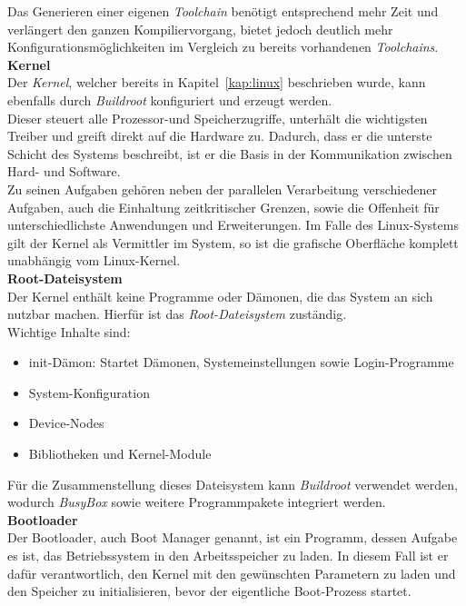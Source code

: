 Das Generieren einer eigenen \emph{Toolchain} benötigt entsprechend mehr Zeit und verlängert den ganzen Kompiliervorgang, bietet jedoch deutlich mehr Konfigurationsmöglichkeiten
im Vergleich zu bereits vorhandenen \emph{Toolchains}.\\

\textbf{Kernel}\\

Der \emph{Kernel}, welcher bereits in Kapitel~\ref{kap:linux} beschrieben wurde, kann ebenfalls durch \emph{Buildroot} konfiguriert und erzeugt werden.\\
Dieser steuert alle Prozessor-und Speicherzugriffe, unterhält die wichtigsten Treiber und greift direkt auf die Hardware zu. Dadurch, dass er die unterste Schicht des Systems beschreibt,
ist er die Basis in der Kommunikation zwischen Hard- und Software.\\
Zu seinen Aufgaben gehören neben der parallelen Verarbeitung verschiedener Aufgaben, auch die Einhaltung zeitkritischer Grenzen, sowie die Offenheit für unterschiedlichste Anwendungen
und Erweiterungen. Im Falle des Linux-Systems gilt der Kernel als Vermittler im System, so ist die grafische Oberfläche komplett unabhängig vom Linux-Kernel.\cite{datacenter}\\

\textbf{Root-Dateisystem}\\

Der Kernel enthält keine Programme oder Dämonen, die das System an sich nutzbar machen. Hierfür ist das \emph{Root-Dateisystem} zuständig.\\
Wichtige Inhalte sind:
\begin{itemize}
  \item init-Dämon: Startet Dämonen, Systemeinstellungen sowie Login-Programme
  \item System-Konfiguration
  \item Device-Nodes
  \item Bibliotheken und Kernel-Module
\end{itemize}

Für die Zusammenstellung dieses Dateisystem kann \emph{Buildroot} verwendet werden, wodurch \emph{BusyBox} sowie weitere Programmpakete integriert werden.\cite{elektronikpraxis}\\

\textbf{Bootloader}\\

Der Bootloader, auch Boot Manager genannt, ist ein Programm, dessen Aufgabe es ist, das Betriebssystem in den Arbeitsspeicher zu laden. In diesem Fall ist er dafür verantwortlich,
den Kernel mit den gewünschten Parametern zu laden und den Speicher zu initialisieren, bevor der eigentliche Boot-Prozess startet.\cite{searchdatacenter}\\

